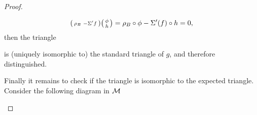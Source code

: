 \begin{proof}
\begin{enumerate}[label={(\bfseries TR\arabic*)}]
{            \[
                \begin{psmallmatrix}
                    \rho_B & -\Sigma' f
                \end{psmallmatrix}
                \begin{psmallmatrix}
                    \phi \\
                    h
                \end{psmallmatrix}
                =
                \rho_B \circ \phi - \Sigma'(f) \circ h = 0,
            \]
            then the triangle
            \begin{center}
            \end{center} 
            is (uniquely isomorphic to) the standard triangle of \( g \), and therefore distinguished. %

            Finally it remains to check if the triangle is isomorphic to the expected triangle. Consider the following diagram in \( {\mathcal{M}} \)
            \begin{center}
\end{center}}
\end{enumerate}
\end{proof}
